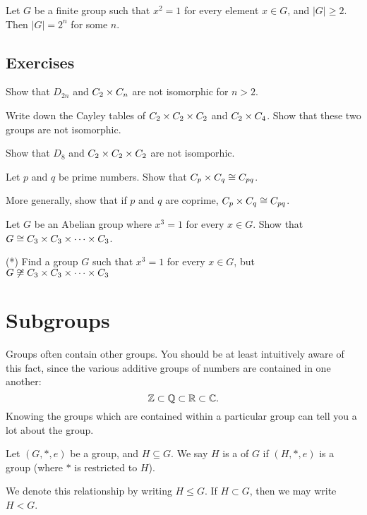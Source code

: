 \begin{corollary}
  Let $G$ be a finite group such that $x^{2} = 1$ for every element $x \in G$,
  and $|G| \ge 2$.
  Then $|G| = 2^{n}$ for some $n$.
\end{corollary}

\subsection*{Exercises}

\begin{exercises}
  \item Show that $D_{2n}$ and $C_{2} \times C_{n}$ are not isomorphic for
    $n > 2$.
  
  \item Write down the Cayley tables of $C_{2} \times C_{2} \times C_{2}$
    and $C_{2} \times C_{4}$.  Show that these two groups are not isomorphic.
  
    Show that $D_{8}$ and $C_{2} \times C_{2} \times C_{2}$ are not isomporhic.
  
  \item Let $p$ and $q$ be prime numbers.  Show that $C_{p} \times C_{q} \cong
    C_{pq}$.
    
    More generally, show that if $p$ and $q$ are coprime, $C_{p} \times C_{q} \cong
    C_{pq}$.

  \item Let $G$ be an Abelian group where $x^{3} = 1$ for every $x \in G$.
    Show that $G \cong C_{3} \times C_{3} \times \cdots \times C_{3}$.
  
  \item (*) Find a group $G$ such that $x^{3} = 1$ for every $x \in
    G$, but $G \not\cong C_{3} \times C_{3} \times \cdots \times C_{3}$
\end{exercises}

\section{Subgroups}

Groups often contain other groups.  You should be at least intuitively aware
of this fact, since the various additive groups of numbers are contained in
one another:
\[
  \mathbb{Z} \subset \mathbb{Q} \subset \mathbb{R} \subset \mathbb{C}.
\]
Knowing the groups which are contained within a particular group can tell you
a lot about the group.

\begin{definition}
  Let $(G, \ast, e)$ be a group, and $H \subseteq G$.  We say $H$ is a
   of $G$ if $(H, \ast, e)$ is a group (where
  $\ast$ is restricted to $H$).
  
  We denote this relationship by writing $H \le G$.  If $H \subset G$, 
  then we may write $H < G$.
\end{definition}

